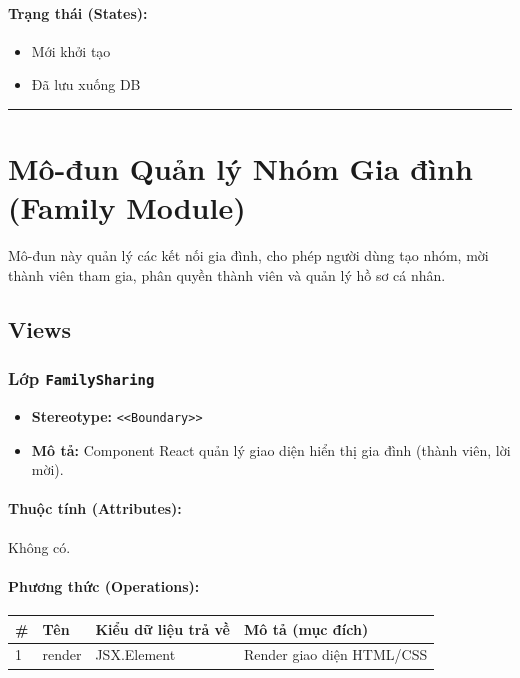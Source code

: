 \documentclass[12pt,a4paper]{article}
\begin{document}
\paragraph{Trạng thái (States):}
\begin{itemize}[leftmargin=*]
    \item Mới khởi tạo
    \item Đã lưu xuống DB
\end{itemize}


\vskip 0.5cm
\noindent\rule{\textwidth}{0.5pt}
\vskip 0.5cm

\section{Mô-đun Quản lý Nhóm Gia đình (Family Module)}


Mô-đun này quản lý các kết nối gia đình, cho phép người dùng tạo nhóm, mời thành viên tham gia, phân quyền thành viên và quản lý hồ sơ cá nhân.

\subsection{Views}


\subsubsection{Lớp \texttt{FamilySharing}}

\begin{itemize}[leftmargin=*]
    \item \textbf{Stereotype:} \texttt{\textless{}\textless{}Boundary\textgreater{}\textgreater{}}
    \item \textbf{Mô tả:} Component React quản lý giao diện hiển thị gia đình (thành viên, lời mời).
\end{itemize}

\paragraph{Thuộc tính (Attributes):}
Không có.

\paragraph{Phương thức (Operations):}
\begin{longtable}{|p{0.6cm}|p{5.0cm}|p{2.8cm}|p{5.4cm}|}
\hline
\textbf{\#} & \textbf{Tên} & \textbf{Kiểu dữ liệu trả về} & \textbf{Mô tả (mục đích)} \\ \hline
\endhead
1 & render & JSX.Element & Render giao diện HTML/CSS \\ \hline
\end{longtable}
\end{document}
